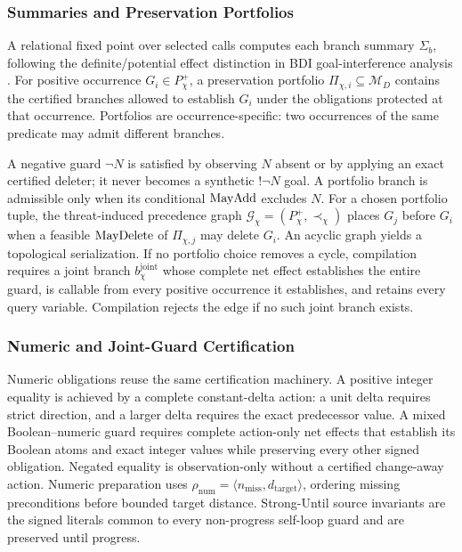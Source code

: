 \subsubsection{Summaries and Preservation Portfolios}

A relational fixed point over selected calls computes each branch summary
$\Sigma_b$, following the definite/potential effect distinction in BDI
goal-interference analysis \cite{Thangarajah2003GoalInterference}. For positive
occurrence $G_i\in P_\chi^+$, a preservation portfolio
$\Pi_{\chi,i}\subseteq\mathcal M_D$ contains the certified branches allowed to
establish $G_i$ under the obligations protected at that occurrence. Portfolios
are occurrence-specific: two occurrences of the same predicate may admit
different branches.

A negative guard $\neg N$ is satisfied by observing $N$ absent or by applying an
exact certified deleter; it never becomes a synthetic $!\neg N$ goal. A portfolio
branch is admissible only when its conditional $\mathrm{MayAdd}$ excludes $N$. For a
chosen portfolio tuple, the
threat-induced precedence graph
$\mathcal G_\chi=(P_\chi^+,\prec_\chi)$ places $G_j$ before $G_i$ when a feasible
$\mathrm{MayDelete}$ of $\Pi_{\chi,j}$ may delete $G_i$. An acyclic graph yields a
topological serialization. If no portfolio choice removes a cycle, compilation
requires a joint branch $b_\chi^{\mathrm{joint}}$ whose complete net effect
establishes the entire guard, is callable from every positive occurrence it
establishes, and retains every query variable. Compilation rejects the edge if
no such joint branch exists.

\subsubsection{Numeric and Joint-Guard Certification}

Numeric obligations reuse the same certification machinery. A positive
integer equality is achieved by a complete constant-delta action: a unit delta
requires strict direction, and a larger delta requires the exact predecessor value. A
mixed Boolean--numeric guard requires complete action-only net effects that
establish its Boolean atoms and exact integer values while preserving every
other signed obligation. Negated equality is observation-only
without a certified change-away action. Numeric preparation uses
$\rho_{\mathrm{num}}=\langle n_{\mathrm{miss}},d_{\mathrm{target}}\rangle$,
ordering missing preconditions before bounded target distance. Strong-Until
source invariants are the signed literals common to every non-progress
self-loop guard and are preserved until progress.

